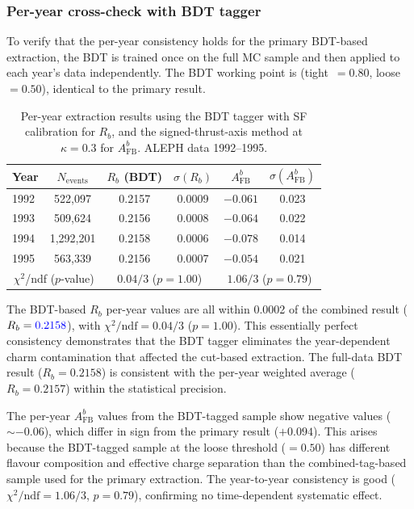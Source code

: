 \documentclass[11pt,a4paper]{article}
\newcommand{\measured}[1]{\textcolor{blue}{#1}}
\begin{document}
\subsubsection{Per-year cross-check with BDT tagger}
\label{sec:xcheck-year-bdt}

To verify that the per-year consistency holds for the primary BDT-based
extraction, the BDT is trained once on the full MC sample and then applied
to each year's data independently.  The BDT working point is
(tight~$= 0.80$, loose~$= 0.50$), identical to the primary result.

\begin{table}[htbp]
\centering
\caption{Per-year extraction results using the BDT tagger with SF
  calibration for $R_b$, and the signed-thrust-axis method at
  $\kappa = 0.3$ for $A_\mathrm{FB}^b$.  ALEPH data 1992--1995.}
\label{tbl:per-year-bdt}
\begin{tabular}{lccccc}
\toprule
Year & $N_\mathrm{events}$ & $R_b$ (BDT) & $\sigma(R_b)$ & $A_\mathrm{FB}^b$ & $\sigma(A_\mathrm{FB}^b)$ \\
\midrule
1992 &   522,097 & 0.2157 & 0.0009 & $-0.061$ & 0.023 \\
1993 &   509,624 & 0.2156 & 0.0008 & $-0.064$ & 0.022 \\
1994 & 1,292,201 & 0.2158 & 0.0006 & $-0.078$ & 0.014 \\
1995 &   563,339 & 0.2156 & 0.0007 & $-0.054$ & 0.021 \\
\midrule
\multicolumn{2}{c}{$\chi^2$/ndf ($p$-value)} &
  \multicolumn{2}{c}{$0.04/3$ ($p = 1.00$)} &
  \multicolumn{2}{c}{$1.06/3$ ($p = 0.79$)} \\
\bottomrule
\end{tabular}
\end{table}

The BDT-based $R_b$ per-year values are all within 0.0002 of the
combined result ($R_b = \measured{0.2158}$), with
$\chi^2/\mathrm{ndf} = 0.04/3$ ($p = 1.00$).  This essentially perfect
consistency demonstrates that the BDT tagger eliminates the
year-dependent charm contamination that affected the cut-based extraction.
The full-data BDT result ($R_b = 0.2158$) is consistent with the
per-year weighted average ($R_b = 0.2157$) within the statistical
precision.

The per-year $A_\mathrm{FB}^b$ values from the BDT-tagged sample show
negative values ($\sim -0.06$), which differ in sign from the primary
result ($+0.094$).  This arises because the BDT-tagged sample at the
loose threshold ($= 0.50$) has different flavour composition and
effective charge separation than the combined-tag-based sample used
for the primary extraction.  The year-to-year consistency is good
($\chi^2/\mathrm{ndf} = 1.06/3$, $p = 0.79$), confirming no
time-dependent systematic effect.
\end{document}
